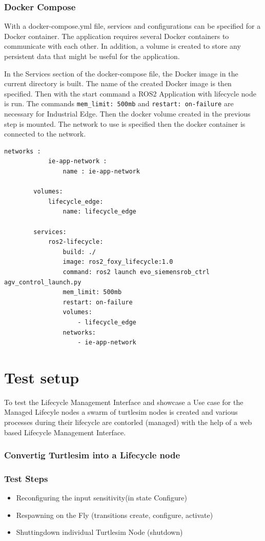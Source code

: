 \subsection{Docker Compose}
With a docker-compose.yml file, services and configurations can be specified for a Docker container. The application requires several Docker containers to communicate with each other. In addition, a volume is created to store any persistent data that might be useful for the application.

In the Services section of the docker-compose file, the Docker image in the current directory is built. The name of the created Docker image is then specified. Then with the start command a \gls{ROS2} Application with lifecycle node is run. The commands \lstinline{mem_limit: 500mb} and \lstinline{restart: on-failure} are necessary for Industrial Edge. Then the docker volume created in the previous step is mounted. The network to use is specified then the docker container is connected to the network.
\begin{lstlisting}[language=docker-compose,
		label={code:Vue}]
		networks :
 			ie-app-network :
	 			name : ie-app-network

		volumes:
			lifecycle_edge:
				name: lifecycle_edge
		
		services:
			ros2-lifecycle:
				build: ./
				image: ros2_foxy_lifecycle:1.0
				command: ros2 launch evo_siemensrob_ctrl agv_control_launch.py 
				mem_limit: 500mb
				restart: on-failure
				volumes:
					- lifecycle_edge
				networks:
					- ie-app-network		
\end{lstlisting}

		
	
\chapter{Test setup}	

To test the Lifecycle Management Interface and showcase a Use case for the Managed Lifecyle nodes a swarm of turtlesim nodes is created and various processes during their lifecycle are contorled (managed) with the help of a web based Lifecycle Management Interface. 
\subsection{Convertig Turtlesim into a Lifecycle node}

\subsection{Test Steps}
\begin{itemize}
	\item Reconfiguring the input sensitivity(in state Configure)
	\item Respawning on the Fly (transitions create, configure, activate)
	\item Shuttingdown individual Turtlesim Node (shutdown)
\end{itemize}